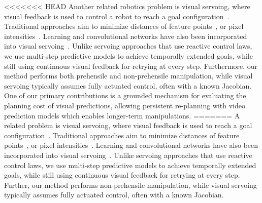 <<<<<<< HEAD
Another related robotics problem is visual servoing, where visual feedback is used to control a robot to reach a goal configuration~\cite{hutchinson1996tutorial,kragic2002survey,desouza2002survey}.
Traditional approaches aim to minimize distances of feature points~\cite{feddema1989vision,espiau1992servo,wilson1996relative}, or pixel intensities~\cite{caron2013photometric}. Learning and convolutional networks have also been incorporated into visual servoing~\cite{saxena2017servoing,bateux2018servoing,lee2017servoing,google_handeye}. Unlike servoing approaches that use reactive control laws, we use multi-step predictive models to achieve temporally extended goals, while still using continuous visual feedback for retrying at every step. Furthermore, our method performs both prehensile and non-prehensile manipulation, while visual servoing typically assumes fully actuated control, often with a known Jacobian.
One of our primary contributions is a grounded mechanism for evaluating the planning cost of visual predictions, allowing persistent re-planning with video prediction models which enables longer-term manipulations.
=======
A related problem is visual servoing, where visual feedback is used to reach a goal configuration~\cite{hutchinson1996tutorial,kragic2002survey,desouza2002survey}.
Traditional approaches aim to minimize distances of feature points~\cite{feddema1989vision,espiau1992servo,wilson1996relative}, or pixel intensities~\cite{caron2013photometric}. Learning and convolutional networks have also been incorporated into visual servoing~\cite{saxena2017servoing,bateux2018servoing,lee2017servoing,google_handeye}. Unlike servoing approaches that use reactive control laws, we use multi-step predictive models to achieve temporally extended goals, while still using continuous visual feedback for retrying at every step. Further, our method performs non-prehensile manipulation, while visual servoing typically assumes fully actuated control, often with a known Jacobian.

